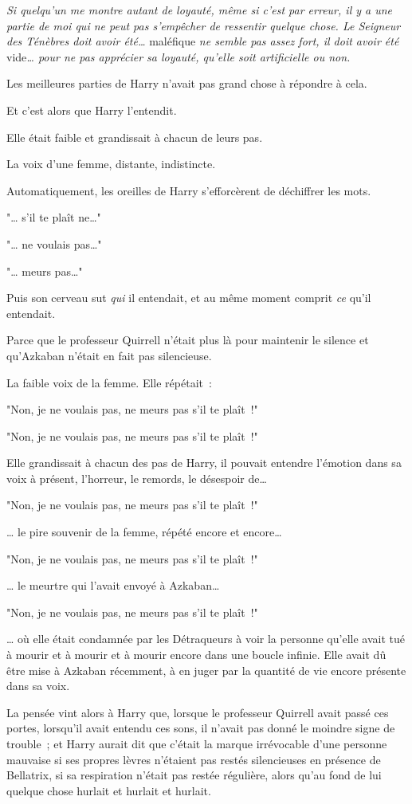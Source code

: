 \emph{Si quelqu'un me montre autant de loyauté, même si c'est par erreur, il y a une partie de moi qui ne peut pas s'empêcher de ressentir quelque chose. Le Seigneur des Ténèbres doit avoir été…} maléfique \emph{ne semble pas assez fort, il doit avoir été} vide\emph{… pour ne pas apprécier sa loyauté, qu'elle soit artificielle ou non.}

Les meilleures parties de Harry n'avait pas grand chose à répondre à cela.

Et c'est alors que Harry l'entendit.

Elle était faible et grandissait à chacun de leurs pas.

La voix d'une femme, distante, indistincte.

Automatiquement, les oreilles de Harry s'efforcèrent de déchiffrer les mots.

"… s'il te plaît ne…"

"… ne voulais pas…"

"… meurs pas…"

Puis son cerveau sut \emph{qui} il entendait, et au même moment comprit \emph{ce} qu'il entendait.

Parce que le professeur Quirrell n'était plus là pour maintenir le silence et qu'Azkaban n'était en fait pas silencieuse.

La faible voix de la femme. Elle répétait~:

"Non, je ne voulais pas, ne meurs pas s'il te plaît~!"

"Non, je ne voulais pas, ne meurs pas s'il te plaît~!"

Elle grandissait à chacun des pas de Harry, il pouvait entendre l'émotion dans sa voix à présent, l'horreur, le remords, le désespoir de…

"Non, je ne voulais pas, ne meurs pas s'il te plaît~!"

… le pire souvenir de la femme, répété encore et encore…

"Non, je ne voulais pas, ne meurs pas s'il te plaît~!"

… le meurtre qui l'avait envoyé à Azkaban…

"Non, je ne voulais pas, ne meurs pas s'il te plaît~!"

… où elle était condamnée par les Détraqueurs à voir la personne qu'elle avait tué à mourir et à mourir et à mourir encore dans une boucle infinie. Elle avait dû être mise à Azkaban récemment, à en juger par la quantité de vie encore présente dans sa voix.

La pensée vint alors à Harry que, lorsque le professeur Quirrell avait passé ces portes, lorsqu'il avait entendu ces sons, il n'avait pas donné le moindre signe de trouble~; et Harry aurait dit que c'était la marque irrévocable d'une personne mauvaise si ses propres lèvres n'étaient pas restés silencieuses en présence de Bellatrix, si sa respiration n'était pas restée régulière, alors qu'au fond de lui quelque chose hurlait et hurlait et hurlait.

